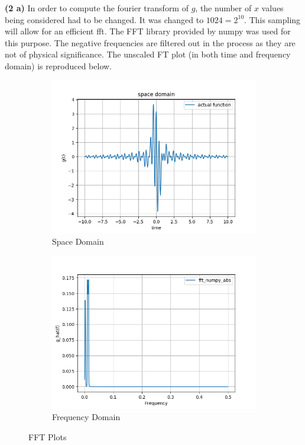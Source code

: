 \documentclass[12pt]{article}
\begin{document}
\textbf{(2 a)}
In order to compute the fourier transform of $g$, the number of $x$ values being considered had to be changed. It was changed to $1024 = 2^{10}$. This sampling will allow for an efficient fft. The FFT library provided by numpy was used for this purpose. The negative frequencies are filtered out in the process as they are not of physical significance. The unscaled FT plot (in both time and frequency domain) is reproduced below. 
\begin{figure}[h]
	\centering
	\begin{subfigure}[h]{0.40\textwidth}
		\centering
		\includegraphics[width=\textwidth]{space_domain_actualfunc1024.png}
		\caption{Space Domain }
	\end{subfigure}
	\begin{subfigure}[h]{0.40\textwidth}
		\centering
		\includegraphics[width=\textwidth]{freq_domain_numpy.png}
		\caption{Frequency Domain}
	\end{subfigure}
	\caption{FFT Plots}
\end{figure}
\end{document}
